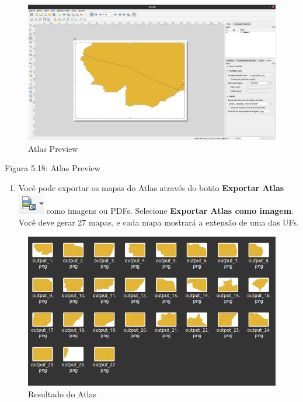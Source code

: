 \documentclass[
  portuguese,
]{krantz}
\providecommand{\tightlist}{%
  \setlength{\itemsep}{0pt}\setlength{\parskip}{0pt}}
\begin{document}
\begin{figure}
\centering
\includegraphics{media/modulo5/atlas-preview.png}
\caption{Atlas Preview}
\end{figure}

Figura 5.18: Atlas Preview

\begin{enumerate}
\def\labelenumi{\arabic{enumi}.}
\setcounter{enumi}{5}
\tightlist
\item
  Você pode exportar os mapas do Atlas através do botão \textbf{Exportar Atlas} \includegraphics{media/modulo5/atlas-export-btn.png} como imagens ou PDFs. Selecione \textbf{Exportar Atlas como imagem}. Você deve gerar 27 mapas, e cada mapa mostrará a extensão de uma das UFs.
\end{enumerate}

\begin{figure}
\centering
\includegraphics{media/modulo5/atlas-outputs.png}
\caption{Resultado do Atlas}
\end{figure}
\end{document}
